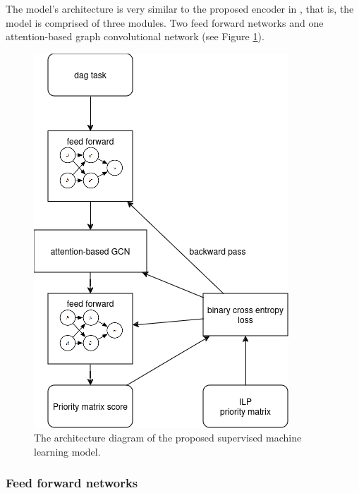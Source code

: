 The model's architecture is very similar to the proposed encoder in \citet{Lee2021GlobalDagSchedDRL},
that is, the model is comprised of three modules.
Two feed forward networks and one attention-based graph convolutional network (see Figure \ref{fig:model_diagram}).

\begin{figure}
    \centering
    \includegraphics[width=\linewidth]{images/designed_model.png}
    \caption{The architecture diagram of the proposed supervised machine learning model.}
    \label{fig:model_diagram}
\end{figure}

\subsubsection{Feed forward networks}
~

